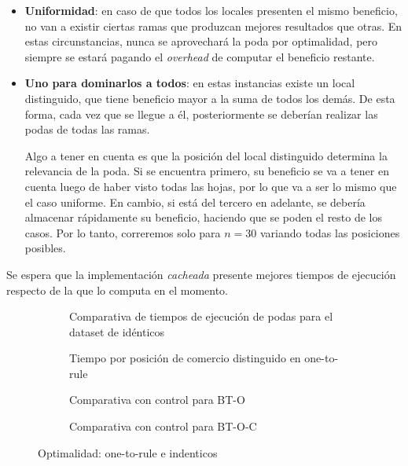 \begin{itemize}
    \item \textbf{Uniformidad}: en caso de que todos los locales presenten el mismo beneficio, no van a existir ciertas ramas que produzcan mejores resultados que otras. En estas circunstancias, nunca se aprovechará la poda por optimalidad, pero siempre se estará pagando el \textit{overhead} de computar el beneficio restante.

    \item \textbf{Uno para dominarlos a todos}: en estas instancias existe un local distinguido, que tiene beneficio mayor a la suma de todos los demás. De esta forma, cada vez que se llegue a él, posteriormente se deberían realizar las podas de todas las ramas.

    Algo a tener en cuenta es que la posición del local distinguido determina la relevancia de la poda. Si se encuentra primero, su beneficio se va a tener en cuenta luego de haber visto todas las hojas, por lo que va a ser lo mismo que el caso uniforme. En cambio, si está del tercero en adelante, se debería almacenar rápidamente su beneficio, haciendo que se poden el resto de los casos. Por lo tanto, correremos solo para $n=30$ variando todas las posiciones posibles.
\end{itemize}

Se espera que la implementación \textit{cacheada} presente mejores tiempos de ejecución respecto de la que lo computa en el momento.

\begin{figure}[H]
    \centering
    \begin{subfigure}[b]{0.45\textwidth}
        
        \caption{Comparativa de tiempos de ejecución de podas para el dataset de idénticos}
        \label{fig:identicos-comp}
    \end{subfigure}
    \begin{subfigure}[b]{0.45\textwidth}
        
        \caption{Tiempo por posición de comercio distinguido en one-to-rule}
        \label{fig:one-to-rule-comp}
    \end{subfigure}
    
    \begin{subfigure}[b]{0.45\textwidth}
        \centering
        
        \caption{Comparativa con control para BT-O}
    \end{subfigure}
    \begin{subfigure}[b]{0.45\textwidth}
        \centering
        
        \caption{Comparativa con control para BT-O-C}
    \end{subfigure}
    \caption{Optimalidad: one-to-rule e indenticos}
\end{figure}

